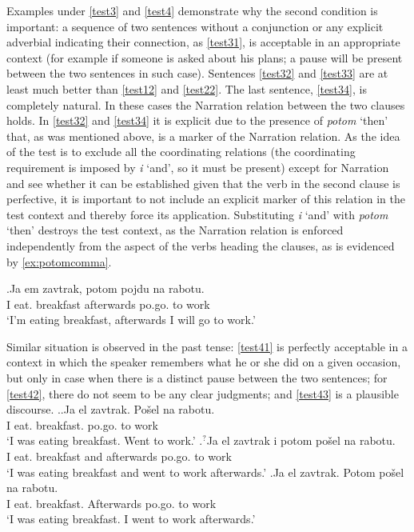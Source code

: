Examples under \ref{test3} and \ref{test4} demonstrate why the second condition is important: a sequence of two sentences without a conjunction or any explicit adverbial indicating their connection, as \ref{test31}, is acceptable in an appropriate context (for example if someone is asked about his plans; a pause will be present between the two sentences in such case). Sentences \ref{test32} and \ref{test33} are at least much better than \ref{test12} and \ref{test22}. The last sentence, \ref{test34}, is completely natural. In these cases the Narration relation between the two clauses holds. In \ref{test32} and \ref{test34} it is explicit due to the presence of \textit{potom} `then' that, as was mentioned above, is a marker of the Narration relation. As the idea of the test is to exclude all the coordinating relations (the coordinating requirement is imposed by \textit{i} `and', so it must be present) except for Narration and see whether it can be established given that the verb in the second clause is perfective, it is important to not include an explicit marker of this relation in the test context and thereby force its application. Substituting  \textit{i} `and' with \textit{potom} `then' destroys the test context, as the Narration relation is enforced independently from the aspect of the verbs heading the clauses, as is evidenced by \ref{ex:potomcomma}.

\exg.\label{ex:potomcomma}Ja em\textsuperscript{\IPF} zavtrak, potom pojdu\textsuperscript{\PF} na rabotu.\\
I eat. breakfast afterwards po.go. to work\\
\trans `I'm eating breakfast, afterwards I will go to work.'

Similar situation is observed in the past tense: \ref{test41} is perfectly acceptable in a context in which the speaker remembers what he or she did on a given occasion, but only in case when there is a distinct pause between the two sentences; for \ref{test42}, there do not seem to be any clear judgments; and \ref{test43} is a plausible discourse.
\ex.\label{test4}\ag.\label{test41}Ja el\textsuperscript{\IPF} zavtrak. Po\v{s}el\textsuperscript{\PF} na rabotu.\\
I eat. breakfast. po.go. to work\\
\trans `I was eating breakfast. Went to work.'
\bg.\label{test42}$^?$Ja el\textsuperscript{\IPF} zavtrak i potom po\v{s}el\textsuperscript{\PF} na rabotu.\\
I eat. breakfast and afterwards po.go. to work\\
\trans `I was eating breakfast and went to work afterwards.'
\bg.\label{test43}Ja el\textsuperscript{\IPF} zavtrak. Potom po\v{s}el\textsuperscript{\PF} na rabotu.\\
I eat. breakfast. Afterwards po.go. to work\\
\trans `I was eating breakfast. I went to work afterwards.'

